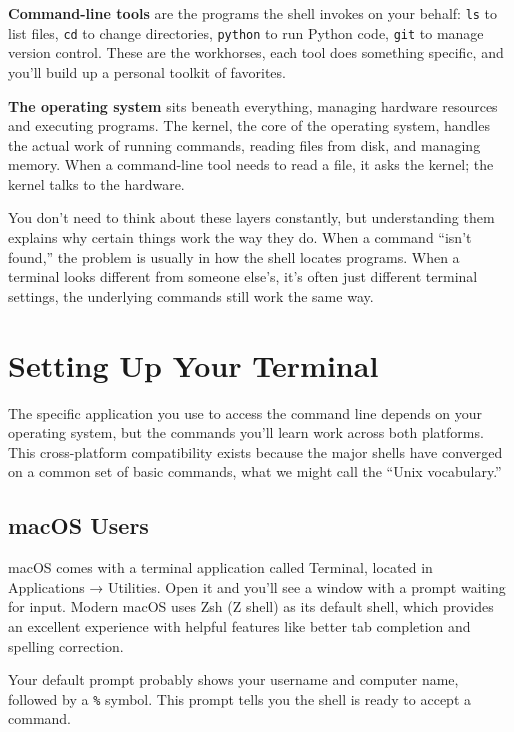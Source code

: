 \documentclass[
  letterpaper,
  DIV=11,
  numbers=noendperiod]{scrreprt}
\begin{document}
\textbf{Command-line tools} are the programs the shell invokes on your
behalf: \texttt{ls} to list files, \texttt{cd} to change directories,
\texttt{python} to run Python code, \texttt{git} to manage version
control. These are the workhorses, each tool does something specific,
and you'll build up a personal toolkit of favorites.

\textbf{The operating system} sits beneath everything, managing hardware
resources and executing programs. The kernel, the core of the operating
system, handles the actual work of running commands, reading files from
disk, and managing memory. When a command-line tool needs to read a
file, it asks the kernel; the kernel talks to the hardware.

You don't need to think about these layers constantly, but understanding
them explains why certain things work the way they do. When a command
``isn't found,'' the problem is usually in how the shell locates
programs. When a terminal looks different from someone else's, it's
often just different terminal settings, the underlying commands still
work the same way.

\section{Setting Up Your Terminal}\label{setting-up-your-terminal}

The specific application you use to access the command line depends on
your operating system, but the commands you'll learn work across both
platforms. This cross-platform compatibility exists because the major
shells have converged on a common set of basic commands, what we might
call the ``Unix vocabulary.''

\subsection{macOS Users}\label{macos-users}

macOS comes with a terminal application called Terminal, located in
Applications → Utilities. Open it and you'll see a window with a prompt
waiting for input. Modern macOS uses Zsh (Z shell) as its default shell,
which provides an excellent experience with helpful features like better
tab completion and spelling correction.

Your default prompt probably shows your username and computer name,
followed by a \texttt{\%} symbol. This prompt tells you the shell is
ready to accept a command.
\end{document}
